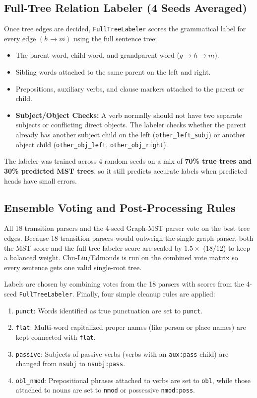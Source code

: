 \documentclass[11pt,a4paper]{article}
\begin{document}
\subsection{Full-Tree Relation Labeler (4 Seeds Averaged)}
Once tree edges are decided, \texttt{FullTreeLabeler} scores the grammatical label for every edge $(h \to m)$ using the full sentence tree:
\begin{itemize}[noitemsep]
    \item The parent word, child word, and grandparent word ($g \to h \to m$).
    \item Sibling words attached to the same parent on the left and right.
    \item Prepositions, auxiliary verbs, and clause markers attached to the parent or child.
    \item \textbf{Subject/Object Checks:} A verb normally should not have two separate subjects or conflicting direct objects. The labeler checks whether the parent already has another subject child on the left (\texttt{other\_left\_subj}) or another object child (\texttt{other\_obj\_left}, \texttt{other\_obj\_right}).
\end{itemize}
The labeler was trained across 4 random seeds on a mix of \textbf{70\% true trees and 30\% predicted MST trees}, so it still predicts accurate labels when predicted heads have small errors.

\subsection{Ensemble Voting and Post-Processing Rules}
All 18 transition parsers and the 4-seed Graph-MST parser vote on the best tree edges. Because 18 transition parsers would outweigh the single graph parser, both the MST score and the full-tree labeler score are scaled by $1.5\times$ ($18/12$) to keep a balanced weight. Chu-Liu/Edmonds is run on the combined vote matrix so every sentence gets one valid single-root tree.

Labels are chosen by combining votes from the 18 parsers with scores from the 4-seed \texttt{FullTreeLabeler}. Finally, four simple cleanup rules are applied:
\begin{enumerate}[noitemsep]
    \item \texttt{punct}: Words identified as true punctuation are set to \texttt{punct}.
    \item \texttt{flat}: Multi-word capitalized proper names (like person or place names) are kept connected with \texttt{flat}.
    \item \texttt{passive}: Subjects of passive verbs (verbs with an \texttt{aux:pass} child) are changed from \texttt{nsubj} to \texttt{nsubj:pass}.
    \item \texttt{obl\_nmod}: Prepositional phrases attached to verbs are set to \texttt{obl}, while those attached to nouns are set to \texttt{nmod} or possessive \texttt{nmod:poss}.
\end{enumerate}
\end{document}
